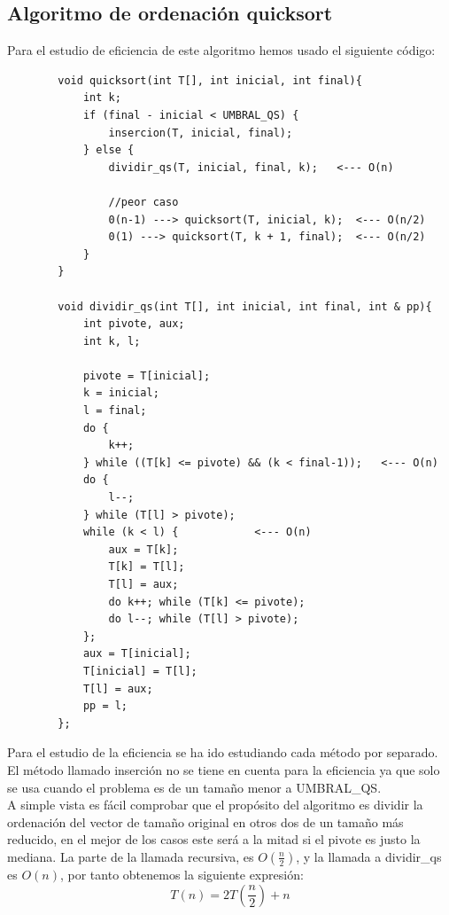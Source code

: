 \documentclass[11pt]{article}
\begin{document}
        \subsection*{Algoritmo de ordenación quicksort}
        Para el estudio de eficiencia de este algoritmo hemos usado el siguiente código:
        \begin{lstlisting}
        void quicksort(int T[], int inicial, int final){
            int k;
            if (final - inicial < UMBRAL_QS) {
                insercion(T, inicial, final);
            } else {
                dividir_qs(T, inicial, final, k);   <--- O(n)

                //peor caso    
                0(n-1) ---> quicksort(T, inicial, k);  <--- O(n/2)
                0(1) ---> quicksort(T, k + 1, final);  <--- O(n/2)
            }
        }

        void dividir_qs(int T[], int inicial, int final, int & pp){
            int pivote, aux;
            int k, l;

            pivote = T[inicial];
            k = inicial;
            l = final;
            do {
                k++;
            } while ((T[k] <= pivote) && (k < final-1));   <--- O(n)
            do {
                l--;
            } while (T[l] > pivote);
            while (k < l) {            <--- O(n)
                aux = T[k];
                T[k] = T[l];
                T[l] = aux;
                do k++; while (T[k] <= pivote);
                do l--; while (T[l] > pivote);
            };
            aux = T[inicial];
            T[inicial] = T[l];
            T[l] = aux;
            pp = l;
        };
        \end{lstlisting}
        Para el estudio de la eficiencia se ha ido estudiando cada método por separado. El método llamado inserción 
        no se tiene en cuenta para la eficiencia ya que solo se usa cuando el problema es de un tamaño menor a UMBRAL\_QS.\\
        A simple vista es fácil comprobar que el propósito del algoritmo es dividir la ordenación del vector de tamaño
        original en otros dos de un tamaño más reducido, en el mejor de los casos este será a la mitad si el pivote es 
        justo la mediana. La parte de la llamada recursiva, es $O(\frac{n}{2})$, y la llamada a dividir\_qs es $O(n)$, por tanto obtenemos
        la siguiente expresión:
        \begin{equation*}
            T(n) = 2 T\left(\frac{n}{2}\right) + n
        \end{equation*}
\end{document}
